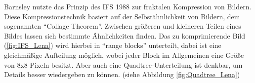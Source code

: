 \begin{figure}
  \centering
  \qquad
\end{figure}

Barnsley nutzte das Prinzip des IFS 1988 zur fraktalen Kompression von Bildern. 
Diese Kompressionstechnik basiert auf der Selbstähnlichkeit von Bildern, dem 
sogenannten "`Collage Theorem"'. Zwischen größeren und kleineren Teilen eines 
Bildes lassen sich bestimmte Ähnlichkeiten finden. Das zu komprimierende Bild 
(\ref{fig:IFS_Lena}) wird hierbei in "`range blocks"' unterteilt, dabei ist 
eine gleichmäßige Aufteilung möglich, wobei jeder Block im Allgemeinen eine 
Größe von 8x8 Pixeln besitzt. Aber auch eine Quadtree-Unterteilung ist denkbar, 
um Details besser wiedergeben zu können. (siehe Abbildung \ref{fig:Quadtree_Lena})

